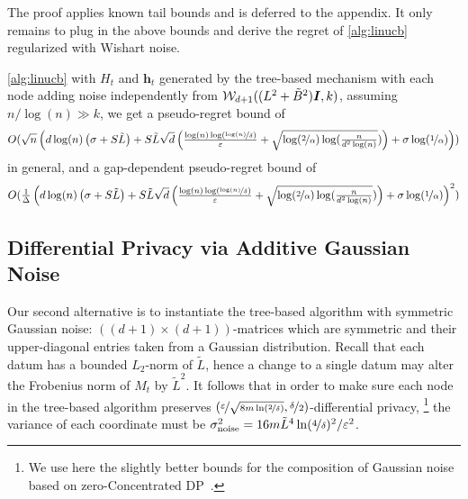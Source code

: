 \documentclass{article}
\renewcommand{\vec}[1]{\bm{#1}}
\newcommand{\Wishart}{\mathcal{W}}
\newcommand{\Eye}[1][]{\bm{I}\notblank{#1}{_{{#1}\times{#1}}}{}}
\begin{document}
The proof applies known tail bounds and is deferred to the appendix.
It only remains to plug in the above bounds and derive the
regret of \cref{alg:linucb} regularized with Wishart noise.
\begin{corollary}
\label{cor:regret_with_Wishart}
\cref{alg:linucb} with $H_t$ and $\vec h_t$ generated by the tree-based
mechanism with each node adding noise independently from
$\Wishart_{d+1}( (L^2+\tilde B^2)\Eye, k )$, assuming
$n/\log(n)\gg k$, we get a pseudo-regret bound of
\[ O(\sqrt n\left( d\log(n)\left( \sigma+S\tilde{L} \right) +S\tilde{L}\sqrt d \left( \tfrac{\log(n)\log(\nicefrac{\log(n)}{\delta})}{\varepsilon} +\sqrt{\log(\nicefrac 2 \alpha)\log(\tfrac{n}{d^2\log(n)}}) \right) +\sigma\log(\nicefrac 1 \alpha) \right) )  \] in general, and a gap-dependent pseudo-regret bound of
\[ O(\tfrac1 \Delta\left( d\log(n)\left( \sigma+S\tilde{L} \right) +S\tilde{L}\sqrt d \left( \tfrac{\log(n)\log(\nicefrac{\log(n)}{\delta})}{\varepsilon} +\sqrt{\log(\nicefrac 2 \alpha)\log(\tfrac{n}{d^2\log(n)}}) \right) +\sigma\log(\nicefrac 1 \alpha) \right)^2 ) \]
\end{corollary}

\subsection{Differential Privacy via Additive Gaussian Noise}
\label{sec:dp-gauss}

Our second alternative is to instantiate the tree-based algorithm with
symmetric Gaussian noise: $\left((d+1)\times (d+1)\right)$-matrices
which are symmetric and their upper-diagonal entries taken from a
Gaussian distribution. Recall that each datum has a bounded $L_2$-norm
of $\tilde L$, hence a change to a single datum may alter the
Frobenius norm of $M_t$ by $\tilde L^2$. It follows that in order to
make sure each node in the tree-based algorithm preserves
$(\nicefrac{\varepsilon}{\sqrt{8m\ln(\nicefrac{2}{\delta})}},
\nicefrac{\delta}{2})$-differential privacy,%
\footnote{We use here the slightly better bounds for the composition
  of Gaussian noise based on zero-Concentrated
  DP~\citep{BunConcentratedDifferentialPrivacy2016}.} %
the variance of each coordinate must be
$\sigma_{\rm noise}^2 = 16m\tilde L ^4 \ln(\nicefrac 4 \delta)^2 /
\varepsilon^2$.
\end{document}
